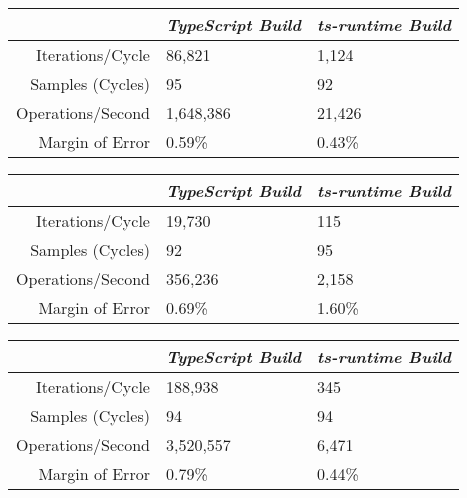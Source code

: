 \begin{center}
{
\centering
\tabulinesep=1.2mm
\setlength{\tabcolsep}{5mm}
\def\arraystretch{1.25}
\small
\begin{tabu} to \textwidth {|r||X[c,m]|X[c,m]|}
  \hline
  & \emph{TypeScript Build} & \emph{ts-runtime Build} \\
  \hline
  \hline
  Iterations/Cycle  & 86,821 & 1,124 \\
  \hline
  Samples (Cycles)  & 95 & 92 \\
  \hline
  Operations/Second & 1,648,386 & 21,426 \\
  \hline
  Margin of Error   & 0.59\% & 0.43\% \\
  \hline
\end{tabu}
}
\end{center}

\begin{center}
{
\centering
\tabulinesep=1.2mm
\setlength{\tabcolsep}{5mm}
\def\arraystretch{1.25}
\small
\begin{tabu} to \textwidth {|r||X[c,m]|X[c,m]|}
  \hline
  & \emph{TypeScript Build} & \emph{ts-runtime Build} \\
  \hline
  \hline
  Iterations/Cycle  & 19,730 & 115 \\
  \hline
  Samples (Cycles)  & 92 & 95 \\
  \hline
  Operations/Second & 356,236 & 2,158 \\
  \hline
  Margin of Error   & 0.69\% & 1.60\% \\
  \hline
\end{tabu}
}
\end{center}

\begin{center}
{
\centering
\tabulinesep=1.2mm
\setlength{\tabcolsep}{5mm}
\def\arraystretch{1.25}
\small
\begin{tabu} to \textwidth {|r||X[c,m]|X[c,m]|}
  \hline
  & \emph{TypeScript Build} & \emph{ts-runtime Build} \\
  \hline
  \hline
  Iterations/Cycle  & 188,938 & 345 \\
  \hline
  Samples (Cycles)  & 94 & 94 \\
  \hline
  Operations/Second & 3,520,557 & 6,471 \\
  \hline
  Margin of Error   & 0.79\% & 0.44\% \\
  \hline
\end{tabu}
}
\end{center}

